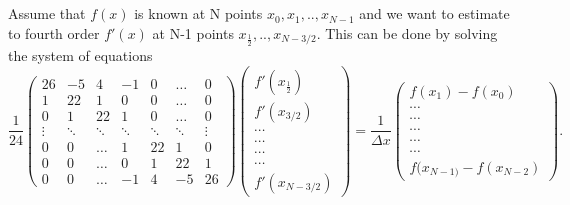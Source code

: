 \documentclass[12pt,reqno]{amsart}
\theoremstyle{definition}
\numberwithin{equation}{section}
\begin{document}
			\section{}\label{appendix}
			Assume that $f(x)$ is known at N points $x_0,x_1, ..,x_{N-1}$
			and we want to estimate to fourth order $f'(x)$ at N-1 points
			$x_{\frac{1}{2}},..,x_{N-3/2}$. This can be done  by solving the system of equations
			\begin{equation}\label{eq:lhs}
				\frac{1}{24}
				\begin{pmatrix}
					26     & -5     & 4      & -1     & 0      & \dots  & 0      \\
					1      & 22     & 1      & 0      & 0      & \dots  & 0      \\
					0      & 1      & 22     & 1      & 0      & \dots  & 0      \\
					\vdots & \ddots & \ddots & \ddots & \ddots & \ddots & \vdots \\
					0      & 0      & \dots  & 1      & 22     & 1      & 0      \\
					0      & 0      & \dots  & 0      & 1      & 22     & 1      \\
					0      & 0      & \dots  & -1     & 4      & -5     & 26
				\end{pmatrix}
				\begin{pmatrix}
					f'(x_{\frac{1}{2}}) \\
					f'(x_{3/2}) \\
					\cdots \\
					\cdots\\
					\cdots \\
					\cdots \\
					f'(x_{N-3/2})
				\end{pmatrix}=
				\frac{1}{\Delta x}
				\begin{pmatrix}
					f(x_{1})-f(x_0)  \\
					\cdots \\
					\cdots\\
					\cdots \\
					\cdots \\
					\cdots \\
					f(x_{N-1)}-f(x_{N-2})
				\end{pmatrix}.
			\end{equation}
	
\end{document}
